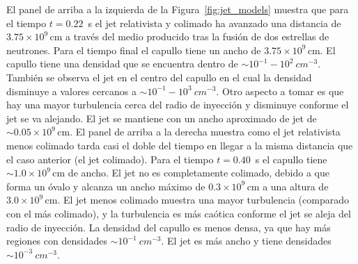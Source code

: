 \documentclass[12pt,a4paper]{book}
\begin{document}
El panel de arriba a la izquierda de la Figura~\ref{fig:jet_models} muestra que para el tiempo $t = 0.22$~s el jet relativista y colimado ha avanzado una distancia de $3.75 \times 10^9 \, \text{cm}$ a través 
del medio producido tras la fusión de dos estrellas de neutrones. Para el tiempo final el capullo tiene un ancho de $3.75 \times 10^9 \, \text{cm}$. El capullo tiene una densidad que se encuentra dentro 
de $\sim10^{-1}-10^{2} ~cm^{-3}$. También se observa el jet en el centro del capullo en el cual la densidad disminuye a valores cercanos a $\sim 10^{-1}-10^{3} ~cm^{-3}$. Otro aspecto a tomar es que hay una mayor 
turbulencia cerca del radio de 
inyección y disminuye conforme el jet se va alejando. El jet se mantiene con un ancho aproximado de jet de $\sim 0.05 \times 10^9 \, \text{cm}$. El panel de arriba a la derecha muestra como el jet relativista menos 
colimado tarda casi el doble del tiempo en llegar a la misma distancia que el caso anterior (el jet colimado). Para el tiempo $t = 0.40$~s el capullo tiene $\sim 1.0 \times 10^9 \, \text{cm}$ de ancho. El jet no es 
completamente colimado, debido a que forma un óvalo y alcanza un ancho máximo de $0.3 \times 10^9 \, \text{cm}$ a una altura de $3.0 \times 10^9 \, \text{cm}$. El jet menos colimado muestra una mayor 
turbulencia (comparado con el más colimado), y la turbulencia es más caótica conforme el jet se aleja del radio de inyección. La densidad del capullo es menos densa, ya que hay más regiones con densidades 
$\sim 10^{-1} ~cm^{-3}$. El jet es más ancho y tiene densidades $\sim 10^{-3} ~cm^{-3}$.
\end{document}
